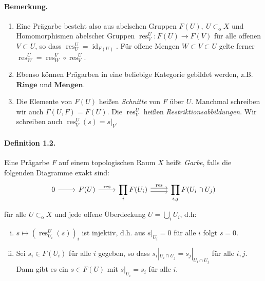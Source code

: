 \documentclass[11pt,b5paper,openany]{memoir}
\begin{document}
\paragraph{Bemerkung.}\begin{enumerate}
\item Eine Prägarbe besteht also aus abelschen Gruppen $F(U),\ U\subset_\text{o}X$ und Homomorphismen abelscher Gruppen $\operatorname{res}_V^U:F(U)\to F(V)$ für alle offenen $V\subset U$, so dass $\operatorname{res}_U^U=\operatorname{id}_{F(U)}$. Für offene Mengen $W\subset V\subset U$ gelte ferner $\operatorname{res}_W^U=\operatorname{res}_W^V\circ\operatorname{res}_V^U$.
\item Ebenso können Prägarben in eine beliebige Kategorie gebildet werden, z.B. $\textbf{Ringe}$ und $\textbf{Mengen}$.
\item Die Elemente von $F(U)$ heißen \textit{Schnitte} von $F$ über $U$. Manchmal schreiben wir auch $\Gamma(U,F)=F(U)$. Die $\operatorname{res}_V^U$ heißen \textit{Restriktionsabbildungen}. Wir schreiben auch $\operatorname{res}_V^U(s)=s|_V$.
\end{enumerate}

\paragraph{Definition 1.2.}\label{1.2} Eine Prägarbe $F$ auf einem topologischen Raum $X$ heißt \textit{Garbe}, falls die folgenden Diagramme exakt sind:
\[\begin{tikzcd}
0\ar[r] & F(U)\ar[r, "\operatorname{res}"] & \displaystyle\prod_i F(U_i)\ar[r, "\operatorname{res}", shift left] \ar[r, shift right] & \displaystyle\prod_{i,j}F(U_i\cap U_j)
\end{tikzcd} \]
für alle $U\subset_\text{o}X$ und jede offene Überdeckung $U=\bigcup_i U_i$, d.h:
\begin{enumerate}[(i)]
\item $s\mapsto (\operatorname{res}^U_{U_i}(s))_i$ ist injektiv, d.h. aus $s|_{U_i}=0$ für alle $i$ folgt $s=0$.
\item Sei $s_i\in F(U_i)$ für alle $i$ gegeben, so dass $s_i|_{U_i\cap U_j}=s_j|_{U_i\cap U_j}$ für alle $i,j$. Dann gibt es ein $s\in F(U)$ mit $s|_{U_i}=s_i$ für alle $i$.
\end{enumerate}
\end{document}
